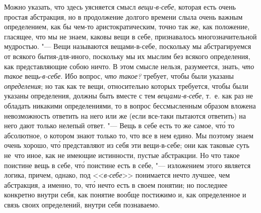 Можно указать, что здесь уясняется смысл
{\em вещи-в-себе}, которая есть очень простая
абстракция, но в продолжение долгого времени слыла очень важным
определением, как бы чем-то аристократическим, точно так же, как положение,
гласящее, что мы не знаем, каковы вещи в себе, признавалось
многозначительной мудростью. "--- Вещи называются вещами-в-себе, поскольку мы
абстрагируемся от всякого бытия-для-иного, поскольку мы их мыслим без
всякого определения, как представляющие собою ничто. В этом смысле нельзя,
разумеется, знать, {\em что такое}
вещь-{\em в-себе}. Ибо вопрос,
{\em что такое?} требует, чтобы были указаны
{\em определения}; но так как те вещи, относительно
которых требуется, чтобы были указаны определения, должны быть вместе с тем
{\em вещами-в-себе}, т.~е. как раз не обладать никакими
определениями, то в вопрос бессмысленным образом вложена невозможность
ответить на него или же (если все-таки пытаются ответить) на него дают только
нелепый ответ. "--- Вещь в себе есть то же самое, чт\'{о} то абсолютное,
о котором знают только то, что все в нем едино. Мы поэтому знаем очень
хорошо, чт\'{о} представляют из себя эти вещи-в-себе; они как таковые суть
не~что иное, как не имеющие истинности, пустые абстракции. Но что такое
поистине вещь в себе, чт\'{о} поистине есть в себе, "--- изложением этого
является логика, причем, однако, под <<{\em в-себе}>> понимается нечто
лучшее, чем абстракция, а именно, то, чт\'{о} нечто есть в своем понятии;
но последнее конкретно внутри себя, как понятие вообще постижимо и, как
определенное и связь своих определений, внутри себя познаваемо.


